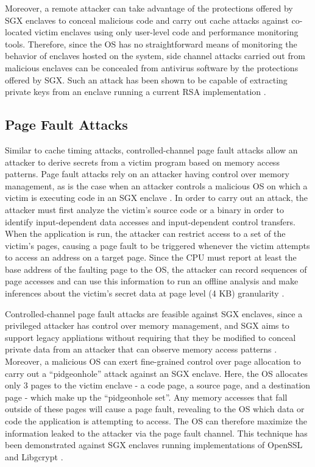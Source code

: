 Moreover, a remote attacker can take advantage of the protections offered by SGX enclaves to conceal malicious code and carry out cache attacks against co-located victim enclaves using only user-level code and performance monitoring tools. Therefore, since the OS has no straightforward means of monitoring the behavior of enclaves hosted on the system, side channel attacks carried out from malicious enclaves can be concealed from antivirus software by the protections offered by SGX. Such an attack has been shown to be capable of extracting private keys from an enclave running a current RSA implementation \cite{schwarz_malware_2017}.

\subsection{Page Fault Attacks}

Similar to cache timing attacks, controlled-channel page fault attacks allow an attacker to derive secrets from a victim program based on memory access patterns. Page fault attacks rely on an attacker having control over memory management, as is the case when an attacker controls a malicious OS on which a victim is executing code in an SGX enclave \cite{intel_corporation_tutorial_2015}. In order to carry out an attack, the attacker must first analyze the victim's source code or a binary in order to identify input-dependent data accesses and input-dependent control transfers. When the application is run, the attacker can restrict access to a set of the victim's pages, causing a page fault to be triggered whenever the victim attempts to access an address on a target page. Since the CPU must report at least the base address of the faulting page to the OS, the attacker can record sequences of page accesses and can use this information to run an offline analysis and make inferences about the victim's secret data at page level (4 KB) granularity \cite{xu_controlled-channel_2015, shinde_preventing_2015}.

Controlled-channel page fault attacks are feasible against SGX enclaves, since a privileged attacker has control over memory management, and SGX aims to support legacy appliations without requiring that they be modified to conceal private data from an attacker that can observe memory access patterns \cite{xu_controlled-channel_2015}. Moreover, a malicious OS can exert fine-grained control over page allocation to carry out a ``pidgeonhole'' attack against an SGX enclave. Here, the OS allocates only 3 pages to the victim enclave - a code page, a source page, and a destination page - which make up the ``pidgeonhole set''. Any memory accesses that fall outside of these pages will cause a page fault, revealing to the OS which data or code the application is attempting to access. The OS can therefore maximize the information leaked to the attacker via the page fault channel. This technique has been demonstrated against SGX enclaves running implementations of OpenSSL and Libgcrypt \cite{shinde_preventing_2015}.

